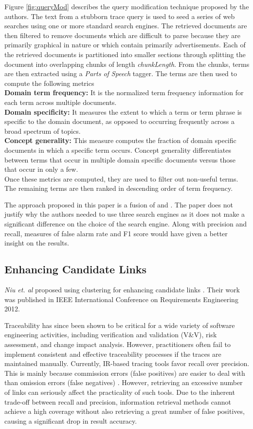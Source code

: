 \documentclass{report}
\begin{document}
Figure \ref{fig:queryMod} describes the query modification technique proposed by the authors. The text
from a stubborn trace query is used to seed a series of web searches using one or more standard search
engines. The retrieved documents are then filtered to remove documents which are difficult to parse
because they are primarily graphical in nature or which contain primarily advertisements. Each of the
retrieved documents is partitioned into smaller sections through splitting the document into overlapping
chunks of length \textit{chunkLength}. From the chunks, terms are then extracted using a \textit{Parts of
Speech} tagger. The terms are then used to compute the following metrics\\
\textbf{Domain term frequency:} It is the normalized term frequency information for each term across
multiple documents.\\
\textbf{Domain specificity:} It measures the extent to which a term or term phrase is specific to the domain document, as opposed to occurring frequently across a broad spectrum of topics.\\
\textbf{Concept generality:} This measure computes the fraction of domain specific documents in which a
specific term occurs. Concept generality differentiates between terms that occur in multiple domain
specific documents versus those that occur in only a few. \\
Once these metrics are computed, they are used to filter out non-useful terms. The remaining terms are
then ranked in descending order of term frequency.

The approach proposed in this paper is a fusion of \cite{clelandHuang10} and \cite{huWiki09}. The paper
does not justify why the authors needed to use three search engines as it does not make a significant
difference on the choice of the search engine. Along with precision and recall, measures of false alarm rate and F1 score would have given a better insight on the results.

\subsection{Enhancing Candidate Links}
\label{sec:enhanceCandidates}
\textit{Niu et. al} proposed using clustering for enhancing candidate links \cite{niu12}. Their work was 
published in IEEE International Conference on Requirements Engineering 2012.

Traceability has since been shown to be critical for a wide variety of software engineering activities,
including verification and validation (V\&V), risk assessment, and change impact analysis. However,
practitioners often fail to implement consistent and effective traceability processes if the traces are
maintained manually. Currently, IR-based tracing tools favor recall over precision. This is mainly because
commission errors (false positives) are easier to deal with than omission errors (false negatives)
\cite{hayes06}. However, retrieving an excessive number of links can seriously affect the practicality of
such tools. Due to the inherent trade-off between recall and precision, information retrieval methods
cannot achieve a high coverage without also retrieving a great number of false positives, causing a
significant drop in result accuracy.
\end{document}
